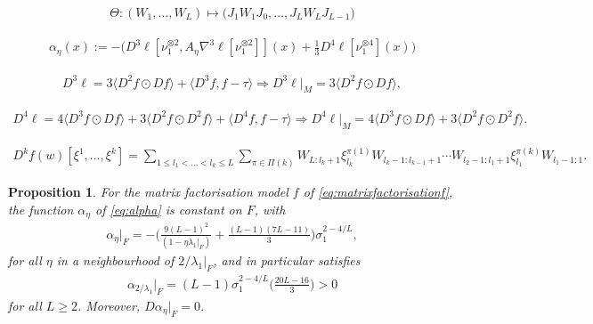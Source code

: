 \documentclass[10pt,a4paper]{amsart}
\newtheorem{proposition}{Proposition}
\begin{document}
    \begin{align}\label{eq:Theta}
    \Theta: (W_1,\dots,W_L) \mapsto \big(J_1W_1J_0,\dots,J_LW_LJ_{L-1}\big)
    \end{align}

\begin{align}\label{eq:alpha}
\alpha_{\eta}(x):=-\bigg(D^3\ell[\nu_1^{\otimes 2},A_{\eta}\nabla^3\ell[\nu_1^{\otimes 2}]](x) + \frac{1}{3}D^4\ell[\nu_1^{\otimes 4}](x)\bigg)
\end{align}

\begin{align}\label{eq:D3ell}
    D^3\ell = 3\langle D^2f\odot Df\rangle + \langle D^3f,f-\tau\rangle\Rightarrow D^3\ell|_M = 3\langle D^2f\odot Df\rangle,
\end{align}

\begin{align}\label{eq:D4ell}
    D^4\ell = 4\langle D^3f\odot Df\rangle + 3\langle D^2f\odot D^2f\rangle + \langle D^4f,f-\tau\rangle\Rightarrow D^4\ell|_M = 4\langle D^3f\odot Df\rangle + 3\langle D^2f\odot D^2f\rangle.
\end{align}

\begin{align}\label{eq:Dkf}
    D^kf(w)[\xi^1,\dots,\xi^k] = \sum_{1\leq l_1<\dots<l_k\leq L}\sum_{\pi\in\Pi(k)}W_{L:l_k+1}\xi^{\pi(1)}_{l_k}W_{l_k-1:l_{k-1}+1}\cdots W_{l_2-1:l_1+1}\xi^{\pi(k)}_{l_1}W_{l_{1}-1:1}.
\end{align}

\begin{proposition}
    For the matrix factorisation model $f$ of \eqref{eq:matrixfactorisationf}, the function $\alpha_{\eta}$ of \eqref{eq:alpha} is constant on $F$, with
    \begin{align}
    \alpha_{\eta}|_{F} = -\bigg(\frac{9(L-1)^2}{(1-\eta\lambda_1|_{F})} + \frac{(L-1)(7L-11)}{3}\bigg)\sigma_1^{2-4/L},
    \end{align}
    for all $\eta$ in a neighbourhood of $2/\lambda_1|_{F}$, and in particular satisfies
    \begin{align}
    \alpha_{2/\lambda_1}|_{F} = (L-1)\sigma_1^{2-4/L}\bigg(\frac{20L-16}{3}\bigg) >0
    \end{align}
    for all $L\geq 2$. Moreover, $D\alpha_{\eta}|_{F} = 0$.
\end{proposition}
\end{document}
